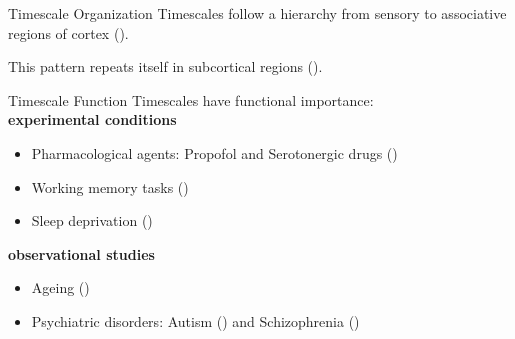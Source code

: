 \documentclass[12pt]{beamer}
\begin{document}
\begin{frame}{Timescale Organization}
\footnotesize
Timescales follow a hierarchy from sensory to associative regions of cortex (\cite{murray_hierarchy_2014}).

This pattern repeats itself in subcortical regions (\cite{raut_hierarchical_2020, muller_core_2020, nougaret_intrinsic_2021}).
\end{frame}

\begin{frame}{Timescale Function}
\footnotesize
Timescales have functional importance:\\ 
\vspace{0.25cm}
\textbf{experimental conditions}
\begin{itemize}
    \item Pharmacological agents: Propofol \cite{huang_timescales_2018} and Serotonergic drugs (\cite{shinn_functional_2023})
    \item Working memory tasks (\cite{gao_neuronal_2020})
    \item Sleep deprivation (\cite{meisel_decline_2017})
\end{itemize}
\vspace{0.25cm}
\textbf{observational studies}
\begin{itemize}
    \item Ageing (\cite{gao_neuronal_2020})
    \item Psychiatric disorders: Autism (\cite{watanabe_atypical_2019}) and Schizophrenia (\cite{wengler_distinct_2020})
\end{itemize}
\end{frame}
\end{document}
